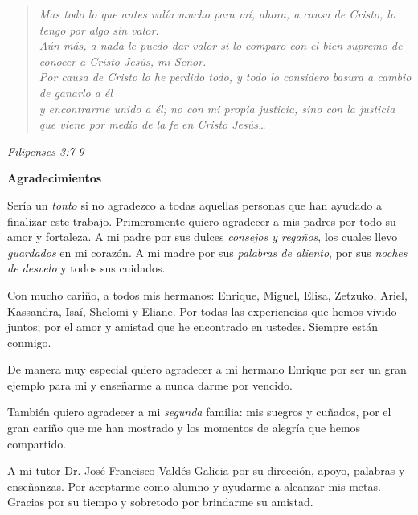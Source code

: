 \newpage
\thispagestyle{empty}
\vspace*{\fill}

\begin{verse}

\emph{Mas todo lo que antes valía mucho para mí, ahora, a causa de Cristo, lo tengo por algo sin valor.\\
Aún más, a nada le puedo dar valor si lo comparo con el bien supremo de conocer a Cristo Jesús, mi Señor.\\ 
Por causa de Cristo lo he perdido todo, y todo lo considero basura a cambio de ganarlo a él\\
y encontrarme unido a él; no con mi propia justicia, sino con la justicia que viene por medio de la fe en Cristo Jesús\ldots}

\end{verse}

\begin{flushright}
\emph{Filipenses 3:7-9}
\end{flushright}
\vspace*{\fill}

\newpage
\thispagestyle{empty}
\vspace*{\fill}
\begin{center}
\textbf{\Large{Agradecimientos}}
\end{center}

Sería un \emph{tonto} si no agradezco a todas aquellas personas que han ayudado a finalizar este trabajo. Primeramente quiero agradecer a mis padres por todo su amor y fortaleza. A mi padre por sus dulces \emph{consejos y regaños}, los cuales llevo \emph{guardados} en mi corazón. A mi madre por sus \emph{palabras de aliento}, por sus \emph{noches de desvelo} y todos sus cuidados. 

Con mucho cariño, a todos mis hermanos: Enrique, Miguel, Elisa, Zetzuko, Ariel, Kassandra, Isaí, Shelomi y Eliane. Por todas las experiencias que hemos vivido juntos; por el amor y amistad que he encontrado en ustedes. Siempre están conmigo. 

De manera muy especial quiero agradecer a mi hermano Enrique por ser un gran ejemplo para mi y enseñarme a nunca darme por vencido.

También quiero agradecer a mi \emph{segunda} familia: mis suegros y cuñados, por el gran cariño que me han mostrado y los momentos de alegría que hemos compartido.   

A mi tutor Dr. José Francisco Valdés-Galicia por su dirección, apoyo, palabras y enseñanzas. Por aceptarme como alumno y ayudarme a alcanzar mis metas. Gracias por su tiempo y sobretodo por brindarme su amistad.

